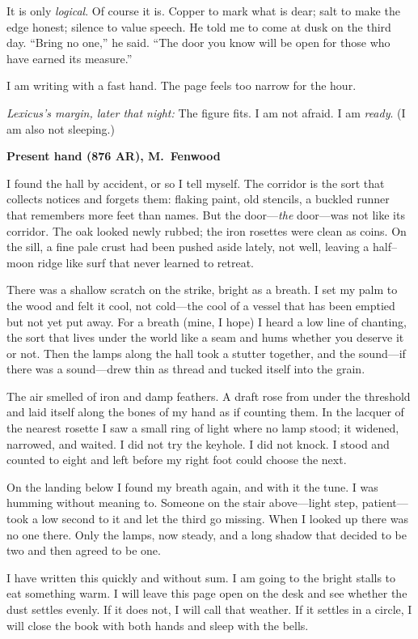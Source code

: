 \documentclass[11pt]{article}
\begin{document}
It is only \emph{logical}. Of course it is. Copper to mark what is dear; salt to make the edge honest; silence to value speech. He told me to come at dusk on the third day. “Bring no one,” he said. “The door you know will be open for those who have earned its measure.”

I am writing with a fast hand. The page feels too narrow for the hour.

\medskip
\noindent\textit{Lexicus’s margin, later that night:} The figure fits. I am not afraid. I am \emph{ready}. (I am also not sleeping.)

\medskip
\noindent\textbf{Present hand (876 AR), M.\ Fenwood}

I found the hall by accident, or so I tell myself. The corridor is the sort that collects notices and forgets them: flaking paint, old stencils, a buckled runner that remembers more feet than names. But the door—\emph{the} door—was not like its corridor. The oak looked newly rubbed; the iron rosettes were clean as coins. On the sill, a fine pale crust had been pushed aside lately, not well, leaving a half–moon ridge like surf that never learned to retreat.

There was a shallow scratch on the strike, bright as a breath. I set my palm to the wood and felt it cool, not cold—the cool of a vessel that has been emptied but not yet put away. For a breath (mine, I hope) I heard a low line of chanting, the sort that lives under the world like a seam and hums whether you deserve it or not. Then the lamps along the hall took a stutter together, and the sound—if there was a sound—drew thin as thread and tucked itself into the grain.

The air smelled of iron and damp feathers. A draft rose from under the threshold and laid itself along the bones of my hand as if counting them. In the lacquer of the nearest rosette I saw a small ring of light where no lamp stood; it widened, narrowed, and waited. I did not try the keyhole. I did not knock. I stood and counted to eight and left before my right foot could choose the next.

On the landing below I found my breath again, and with it the tune. I was humming without meaning to. Someone on the stair above—light step, patient—took a low second to it and let the third go missing. When I looked up there was no one there. Only the lamps, now steady, and a long shadow that decided to be two and then agreed to be one.

I have written this quickly and without sum. I am going to the bright stalls to eat something warm. I will leave this page open on the desk and see whether the dust settles evenly. If it does not, I will call that weather. If it settles in a circle, I will close the book with both hands and sleep with the bells.
\end{document}
